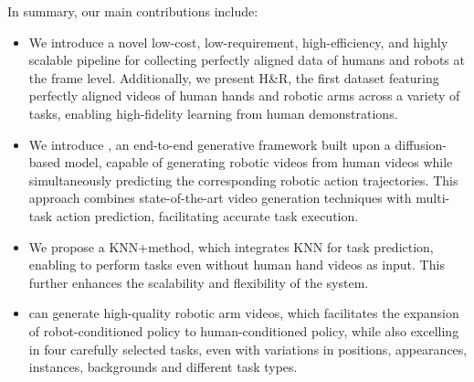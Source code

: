 In summary, our main contributions include:
\begin{itemize}
    \item We introduce a novel low-cost, low-requirement, high-efficiency, and highly scalable pipeline for collecting perfectly aligned data of humans and robots at the frame level. Additionally, we present H\&R, the first dataset featuring perfectly aligned videos of human hands and robotic arms across a variety of tasks, enabling high-fidelity learning from human demonstrations.
    \item We introduce \system, an end-to-end generative framework built upon a diffusion-based model, capable of generating robotic videos from human videos while simultaneously predicting the corresponding robotic action trajectories. This approach combines state-of-the-art video generation techniques with multi-task action prediction, facilitating accurate task execution. 
    \item We propose a KNN+\system method, which integrates KNN for task prediction, enabling to perform tasks even without human hand videos as input. This further enhances the scalability and flexibility of the system. 
    \item \system can generate high-quality robotic arm videos, which facilitates the expansion of robot-conditioned policy to human-conditioned policy, while also excelling in four carefully selected tasks, even with variations in positions, appearances, instances, backgrounds and different task types.
\end{itemize}